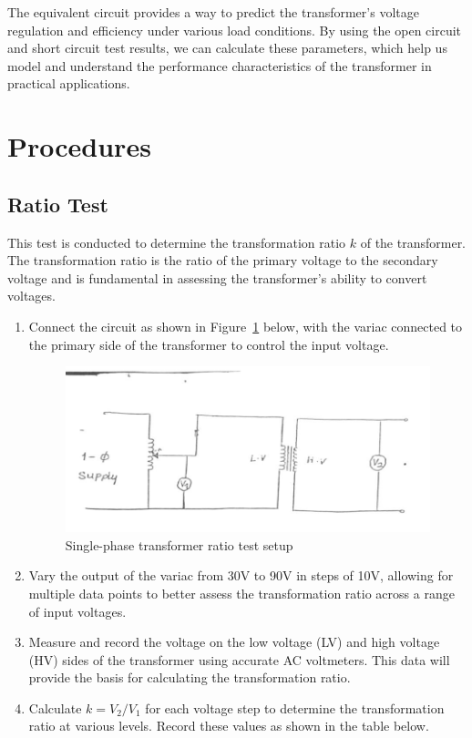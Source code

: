 \documentclass[12pt,a4paper]{report}
\begin{document}
The equivalent circuit provides a way to predict the transformer’s voltage regulation and efficiency under various load conditions. By using the open circuit and short circuit test results, we can calculate these parameters, which help us model and understand the performance characteristics of the transformer in practical applications.

\section{Procedures}

\subsection{Ratio Test}
This test is conducted to determine the transformation ratio \( k \) of the transformer. The transformation ratio is the ratio of the primary voltage to the secondary voltage and is fundamental in assessing the transformer's ability to convert voltages.

\begin{enumerate}
    \item Connect the circuit as shown in Figure~\ref{fig_2} below, with the variac connected to the primary side of the transformer to control the input voltage.
    
    \begin{figure}[H]
        \centering
        \includegraphics[width=0.8\linewidth]{figure_2_2.jpeg}
        \caption{Single-phase transformer ratio test setup}
        \label{fig_2}
    \end{figure}
    
    \item Vary the output of the variac from 30V to 90V in steps of 10V, allowing for multiple data points to better assess the transformation ratio across a range of input voltages.
    
    \item Measure and record the voltage on the low voltage (LV) and high voltage (HV) sides of the transformer using accurate AC voltmeters. This data will provide the basis for calculating the transformation ratio.
    
    \item Calculate \( k = V_2 / V_1 \) for each voltage step to determine the transformation ratio at various levels. Record these values as shown in the table below.

\end{enumerate}
\end{document}
